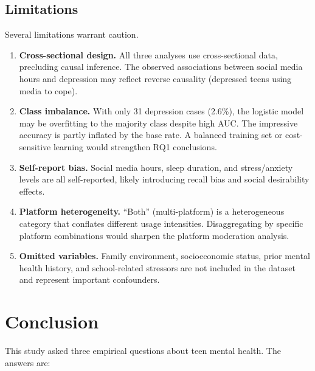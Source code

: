 \documentclass[11pt]{article}
\begin{document}
\subsection{Limitations}

Several limitations warrant caution.

\begin{enumerate}
\item \textbf{Cross-sectional design.}  All three analyses use cross-sectional data, precluding
causal inference.  The observed associations between social media hours and depression may
reflect reverse causality (depressed teens using media to cope).

\item \textbf{Class imbalance.}  With only 31 depression cases (2.6\%), the logistic model
may be overfitting to the majority class despite high AUC.  The impressive accuracy is partly
inflated by the base rate.  A balanced training set or cost-sensitive learning would strengthen
RQ1 conclusions.

\item \textbf{Self-report bias.}  Social media hours, sleep duration, and stress/anxiety levels
are all self-reported, likely introducing recall bias and social desirability effects.

\item \textbf{Platform heterogeneity.}  ``Both'' (multi-platform) is a heterogeneous category
that conflates different usage intensities.  Disaggregating by specific platform combinations
would sharpen the platform moderation analysis.

\item \textbf{Omitted variables.}  Family environment, socioeconomic status, prior mental
health history, and school-related stressors are not included in the dataset and represent
important confounders.
\end{enumerate}

\section{Conclusion}
\label{sec:conclusion}

This study asked three empirical questions about teen mental health.  The answers are:
\end{document}
